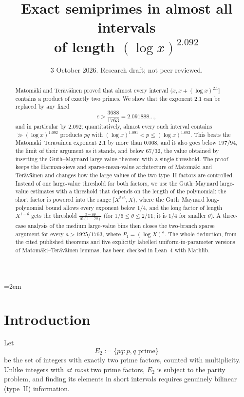 \documentclass[11pt,a4paper]{amsart}
\title[Exact semiprimes in shorter logarithmic intervals]
{Exact semiprimes in almost all intervals\\
 of length \texorpdfstring{$(\log x)^{2.092}$}{(log x)\^{}2.092}}
\date{3 October 2026. Research draft; not peer reviewed.}
\theoremstyle{definition}
\newcommand{\1}{\mathbf 1}
\newcommand{\Etwo}{E_2}
\begin{document}
\emergencystretch=2em

\begin{abstract}
\sloppy
Matom\"aki and Ter\"av\"ainen proved that almost every interval
\((x,x+(\log x)^{2.1}]\) contains a product of exactly two primes.  We
show that the exponent \(2.1\) can be replaced by any fixed
\[
 c>\frac{3688}{1763}=2.091888\ldots,
\]
and in particular by \(2.092\); quantitatively, almost every such
interval contains \(\gg(\log x)^{1.092}\) products \(pq\) with
\((\log x)^{1.091}<p\le(\log x)^{1.092}\).  This beats the
Matom\"aki--Ter\"av\"ainen exponent \(2.1\) by more than \(0.008\), and
it also goes below \(197/94\), the limit of their argument as it stands,
and below \(67/32\), the value obtained by inserting the Guth--Maynard
large-value theorem with a single threshold.  The proof keeps the
Harman-sieve and sparse-mean-value architecture of Matom\"aki and
Ter\"av\"ainen and changes how the large values of the two type~II
factors are controlled.  Instead of one large-value threshold for both
factors, we use the Guth--Maynard large-value estimates with a threshold
that depends on the length of the polynomial: the short factor is
powered into the range \([X^{5/6},X)\), where the Guth--Maynard
long-polynomial bound allows every exponent below \(1/4\), and the long
factor of length \(X^{1-\theta}\) gets the threshold
\(\frac{3-8\theta}{10(1-2\theta)}\) (for \(1/6\le\theta\le2/11\); it is
\(1/4\) for smaller \(\theta\)).  A three-case analysis of the
medium large-value bins then closes the two-branch sparse argument for
every \(a>1925/1763\), where \(P_1=(\log X)^a\).  The whole deduction,
from the cited published theorems and five explicitly labelled
uniform-in-parameter versions of Matom\"aki--Ter\"av\"ainen lemmas, has
been checked in Lean~4 with Mathlib.
\end{abstract}

\maketitle

\section{Introduction}

Let
\[
 \Etwo:=\{pq:p,q\text{ prime}\}
\]
be the set of integers with exactly two prime factors, counted with
multiplicity.  Unlike integers with \emph{at most} two prime factors,
\(\Etwo\) is subject to the parity problem, and finding its elements in
short intervals requires genuinely bilinear (type~II) information.
\end{document}
